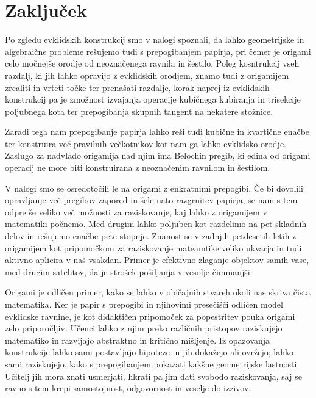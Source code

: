 \section{Zaključek}

Po zgledu evklidskih konstrukcij smo v nalogi spoznali, da lahko geometrijske in algebraične probleme rešujemo tudi s prepogibanjem papirja, pri čemer je origami celo močnejše orodje od neoznačenega ravnila in šestilo. Poleg kosntrukcij vseh razdalj, ki jih lahko opravijo z evklidskih orodjem, znamo tudi z origamijem zrcaliti in vrteti točke ter prenašati razdalje, korak naprej iz evklidskih konstrukcij pa je zmožnost izvajanja operacije kubičnega kubiranja in trisekcije poljubnega kota ter prepogibanja skupnih tangent na nekatere stožnice.

Zaradi tega nam prepogibanje papirja lahko reši tudi kubične in kvartične enačbe ter konstruira več pravilnih večkotnikov kot nam ga lahko evklidsko orodje. Zaslugo za nadvlado origamija nad njim ima Belochin pregib, ki edina od origami operacij ne more biti konstruirana z neoznačenim ravnilom in šestilom.

V nalogi smo se osredotočili le na origami z enkratnimi prepogibi. Če bi dovolili opravljanje več pregibov zapored in šele nato razgrnitev papirja, se nam s tem odpre še veliko več možnosti za raziskovanje, kaj lahko z origamijem v matematiki počnemo. Med drugim lahko poljuben kot razdelimo na pet skladnih delov in rešujemo enačbe pete stopnje. Znanost se v zadnjih petdesetih letih z origamijem kot pripomočkom za raziskovanje mateamtike veliko ukvarja in tudi aktivno aplicira v naš vsakdan. Primer je efektivno zlaganje objektov samih vase, med drugim satelitov, da je strošek pošiljanja v vesolje čimmanjši.

Origami je odličen primer, kako se lahko v običajnih stvareh okoli nas skriva čista matematika. Ker je papir s prepogibi in njihovimi presečišči odličen model evklidske ravnine, je kot didaktičen pripomoček za popestritev pouka origami zelo priporočljiv. Učenci lahko z njim preko različnih pristopov raziskujejo matematiko in razvijajo abstraktno in kritično mišljenje. Iz opazovanja konstrukcije lahko sami postavljajo hipoteze in jih dokažejo ali ovržejo; lahko sami raziskujejo, kako s prepogibanjem pokazati kakšne geometrijske lastnosti. Učitelj jih mora znati usmerjati, hkrati pa jim dati svobodo raziskovanja, saj se ravno s tem krepi samostojnost, odgovornost in veselje do izzivov.
